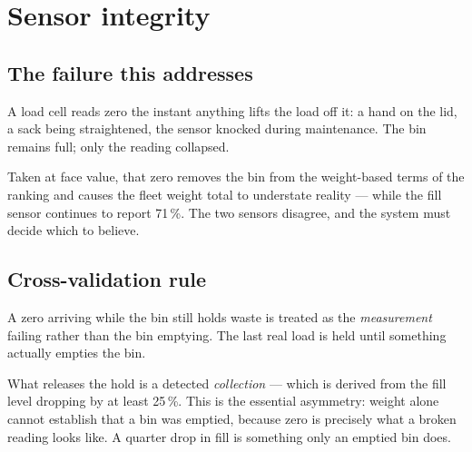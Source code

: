 \documentclass[11pt,a4paper]{article}
\begin{document}
\section{Sensor integrity}

\subsection{The failure this addresses}

A load cell reads zero the instant anything lifts the load off it: a hand
on the lid, a sack being straightened, the sensor knocked during
maintenance. The bin remains full; only the reading collapsed.

Taken at face value, that zero removes the bin from the weight-based
terms of the ranking and causes the fleet weight total to understate
reality --- while the fill sensor continues to report 71\,\%. The two
sensors disagree, and the system must decide which to believe.

\subsection{Cross-validation rule}

A zero arriving while the bin still holds waste is treated as the
\emph{measurement} failing rather than the bin emptying. The last real
load is held until something actually empties the bin.

What releases the hold is a detected \emph{collection} --- which is
derived from the fill level dropping by at least 25\,\%. This is the
essential asymmetry: weight alone cannot establish that a bin was
emptied, because zero is precisely what a broken reading looks like. A
quarter drop in fill is something only an emptied bin does.
\end{document}
